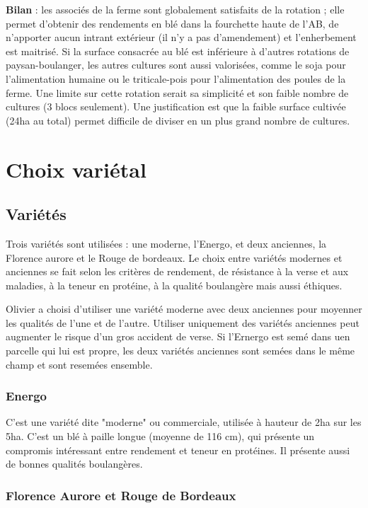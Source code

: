 \documentclass{article}
\begin{document}
\textbf{Bilan} : les associés de la ferme sont globalement satisfaits de la rotation ; elle permet d'obtenir des rendements en blé dans la fourchette haute de l'AB, de n'apporter aucun intrant extérieur (il n'y a pas d'amendement) et l'enherbement est maitrisé. Si la surface consacrée au blé est inférieure à d'autres rotations de paysan-boulanger, les autres cultures sont aussi valorisées, comme le soja pour l'alimentation humaine ou le triticale-pois pour l'alimentation des poules de la ferme. Une limite sur cette rotation serait sa simplicité et son faible nombre de cultures (3 blocs seulement). Une justification est que la faible surface cultivée (24ha au total) permet difficile de diviser en un plus grand nombre de cultures.

\section{Choix variétal}

\subsection{Variétés}

Trois variétés sont utilisées : une moderne, l'Energo, et deux anciennes, la Florence aurore et le Rouge de bordeaux. Le choix entre variétés modernes et anciennes se fait selon les critères de rendement, de résistance à la verse et aux maladies, à la teneur en protéine, à la qualité boulangère mais aussi éthiques. 

Olivier a choisi d'utiliser une variété moderne avec deux anciennes pour moyenner les qualités de l'une et de l'autre. Utiliser uniquement des variétés anciennes peut augmenter le risque d'un gros accident de verse. Si l'Ernergo est semé dans uen parcelle qui lui est propre, les deux variétés anciennes sont semées dans le même champ et sont resemées ensemble. 

\subsubsection{Energo}

C'est une variété dite "moderne" ou commerciale, utilisée à hauteur de 2ha sur les 5ha. C'est un blé à paille longue (moyenne de 116 cm), qui présente un compromis intéressant entre rendement et teneur en protéines. Il présente aussi de bonnes qualités boulangères.

\subsubsection{Florence Aurore et Rouge de Bordeaux}
\end{document}
